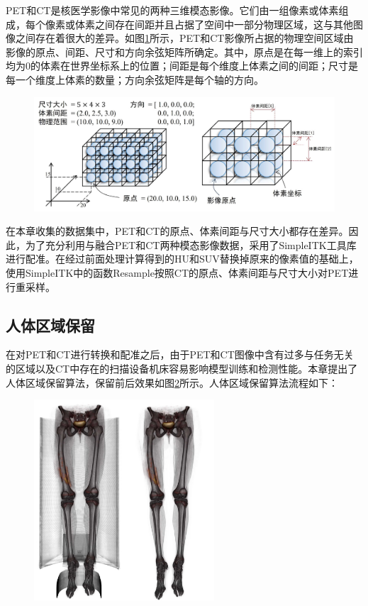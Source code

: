 PET和CT是核医学影像中常见的两种三维模态影像。它们由一组像素或体素组成，每个像素或体素之间存在间距并且占据了空间中一部分物理区域，这与其他图像之间存在着很大的差异。如图\ref{fig:chap04_image}所示，PET和CT影像所占据的物理空间区域由影像的原点、间距、尺寸和方向余弦矩阵所确定。其中，原点是在每一维上的索引均为0的体素在世界坐标系上的位置；间距是每个维度上体素之间的间距；尺寸是每一个维度上体素的数量；方向余弦矩阵是每个轴的方向。

\begin{figure}[htbp]
  \centering
  \includegraphics[width=\textwidth]{figures/chap04_image.jpg}
  \label{fig:chap04_image}
\end{figure}

在本章收集的数据集中，PET和CT的原点、体素间距与尺寸大小都存在差异。因此，为了充分利用与融合PET和CT两种模态影像数据，采用了SimpleITK工具库\cite{yaniv2018simpleitk}进行配准。在经过前面处理计算得到的HU和SUV替换掉原来的像素值的基础上，使用SimpleITK中的函数Resample按照CT的原点、体素间距与尺寸大小对PET进行重采样。

\subsection{人体区域保留}

在对PET和CT进行转换和配准之后，由于PET和CT图像中含有过多与任务无关的区域以及CT中存在的扫描设备机床容易影响模型训练和检测性能。本章提出了人体区域保留算法，保留前后效果如图\ref{fig:chap04_body_retent}所示。人体区域保留算法流程如下：

\begin{figure}[htbp]
  \centering
  \includegraphics[width=0.6\textwidth]{figures/chap04_body_retent.jpg}
  \label{fig:chap04_body_retent}
\end{figure}

